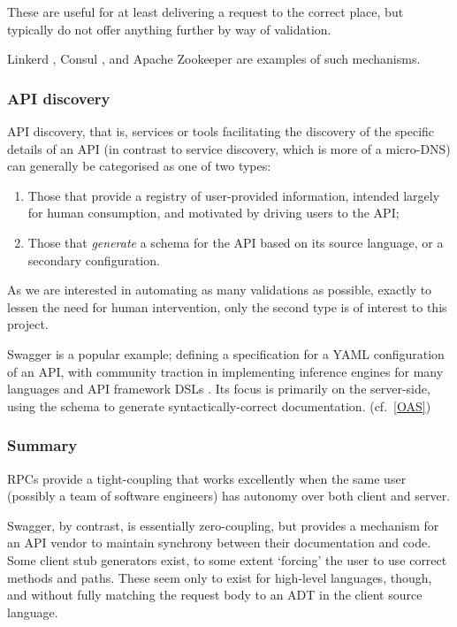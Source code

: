 These are useful for at least delivering a request to the correct place, but typically do not offer anything further by way of validation.

Linkerd \cite{service_discovery_linkerd}, Consul \cite{service_discovery_consul}, and Apache Zookeeper \cite{service_discovery_apache} are examples of such mechanisms.

\subsubsection{API discovery}\label{api-discovery}
API discovery, that is, services or tools facilitating the discovery of the specific details of an API (in contrast to service discovery, which is more of a micro-DNS) can generally be categorised as one of two types:

\begin{enumerate}
\item Those that provide a registry of user-provided information, intended largely for human consumption, and motivated by driving users to the API;
\item Those that \emph{generate} a schema for the API based on its source language, or a secondary configuration.
\end{enumerate}

As we are interested in automating as many validations as possible, exactly to lessen the need for human intervention, only the second type is of interest to this project.

Swagger \cite{swagger} is a popular example; defining a specification for a YAML \cite{yaml} configuration of an API, with community traction in implementing inference engines for many languages and API framework DSLs \cite{swagger_oss}. Its focus is primarily on the server-side, using the schema to generate syntactically-correct documentation. (cf.~\ref{OAS})

\subsubsection{Summary}\label{existing-soln-summary}
RPCs provide a tight-coupling that works excellently when the same user (possibly a team of software engineers) has autonomy over both client and server.

Swagger, by contrast, is essentially zero-coupling, but provides a mechanism for an API vendor to maintain synchrony between their documentation and code. Some client stub generators exist, to some extent `forcing' the user to use correct methods and paths. These seem only to exist for high-level languages, though, and without fully matching the request body to an ADT in the client source language. \cite{swagger_oss}

